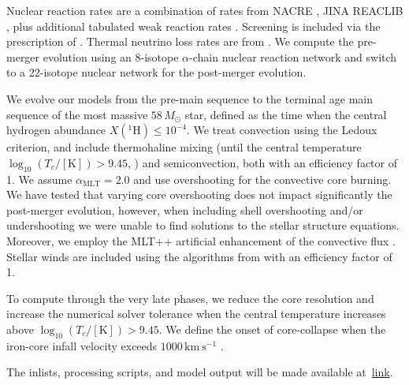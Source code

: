 \documentclass[twocolumn,twocolappendix,trackchanges]{aastex63}
\begin{document}
Nuclear reaction rates are a combination of rates from NACRE
\citep{Angulo1999}, JINA REACLIB \citep{Cyburt2010}, plus additional
tabulated weak reaction rates \citet{Fuller1985, Oda1994,
  Langanke2000}. Screening is included via the prescription of
\citet{Chugunov2007}.  Thermal neutrino loss rates are from
\citet{Itoh1996}. We compute the pre-merger evolution using an
8-isotope $\alpha$-chain nuclear reaction network and switch to a
22-isotope nuclear network for the post-merger evolution.

We evolve our models from the pre-main sequence to the terminal age
main sequence of the most massive $58\,M_\odot$ star, defined as the
time when the central hydrogen abundance $X(^1\mathrm{H})\leq 10^{-4}$.
We treat convection using the Ledoux criterion, and include
thermohaline mixing (until the central temperature
$\log_{10}(T_c/\mathrm{[K]})>9.45$, \citealt{farmer:16}) and semiconvection, both with an
efficiency factor of 1. We assume $\alpha_\mathrm{MLT}=2.0$ and use
\cite{brott:11} overshooting for the convective core burning. We have
tested that varying core overshooting does not impact significantly the
post-merger evolution, however, when including shell overshooting
and/or undershooting we were unable to find solutions to the stellar
structure equations. Moreover, we employ the MLT++ artificial
enhancement of the convective flux \citep[e.g.,][]{paxton:15,
  jiang:15}. Stellar winds are included using the algorithms from
\cite{vink:01} with an efficiency factor of 1.%

To compute through the very late phases, we reduce the core resolution
and increase the numerical solver tolerance when the central
temperature increases above $\log_{10}(T_c/\mathrm{[K]})>9.45$. We
define the onset of core-collapse when the iron-core infall velocity
exceeds $1000\,\mathrm{km\ s^{-1}}$ \citep[e.g.,][]{woosley:02}.

The inlists, processing scripts, and model output will be made available at~\href{link}{link}.



\end{document}

